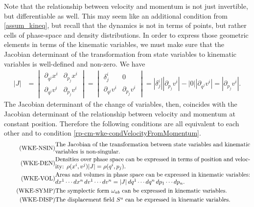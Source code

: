 Note that the relationship between velocity and momentum is not just invertible, but differentiable as well. This may seem like an additional condition from \ref{assum_kineq}, but recall that the dynamics is not in terms of points, but rather cells of phase-space and density distributions. In order to express those geometric elements in terms of the kinematic variables, we must make sure that the Jacobian determinant of the transformation from state variables to kinematic variables is well-defined and non-zero. We have
\begin{equation}\label{rp-cm-lm-JacobianMomentumVelocity}
	\begin{aligned}
		|J| &= \begin{vmatrix}
			\partial_{q^j} x^i & \partial_{p_j} x^i  \\
			\partial_{q^j} v^i & \partial_{p_j} v^i
		\end{vmatrix}
		= \begin{vmatrix}
			\delta^i_j & 0 \\
			\partial_{q^j} v^i & \partial_{p_j} v^i
		\end{vmatrix} 
		= \left|\delta^i_j\right| \left|\partial_{p_j} v^i\right| - |0| \left|\partial_{q^j} v^i\right| = \left|\partial_{p_j} v^i\right|.
	\end{aligned}
\end{equation}
The Jacobian determinant of the change of variables, then, coincides with the Jacobian determinant of the relationship between velocity and momentum at constant position. Therefore the following conditions are all equivalent to each other and to condition \ref{rp-cm-wke-condVelocityFromMomentum}.
\begin{align}
	\tag{WKE-NSIN}\label{rp-cm-wke-condJacobianNonSingular}
	&\eqtext{The Jacobian of the transformation between state variables and kinematic variables is non-singular.} \\
	\tag{WKE-DEN}\label{rp-cm-wke-condDensities}
	&\eqtext{Densities over phase space can be expressed in terms of position and velocity: $\rho(x^i, v^j) |J| = \rho(q^i, p_j)$.} \\
	\tag{WKE-VOL}\label{rp-cm-wke-condAreas}
	&\eqtext{Areas and volumes in phase space can be expressed in kinematic variables: $dx^1 \cdots dx^n \, dv^1 \cdots dv^n = |J| \, dq^1 \cdots dq^n \, dp_1 \cdots dp_n$.} \\
	\tag{WKE-SYMP}\label{rp-cm-wke-condSymplectic}
	&\eqtext{The symplectic form $\omega_{ab}$ can be expressed in kinematic variables.} \\
	\tag{WKE-DISP}\label{rp-cm-wke-condDisplacement}
	&\eqtext{The displacement field $S^a$ can be expressed in kinematic variables.}
\end{align}


